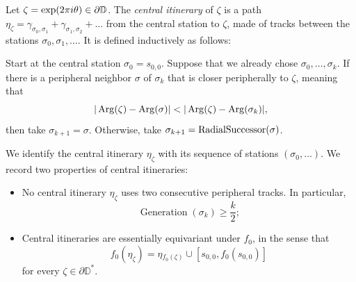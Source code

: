 \begin{definition}
Let $\zeta=\exp(2\pi i\theta)\in\partial\mathbb{D}$. 
The \emph{central itinerary} of $\zeta$ is a path 
$\eta_\zeta = \gamma _{\sigma_0,\sigma_1} + \gamma_{\sigma_1,\sigma_2}+\ldots$ 
from the central station to $\zeta$, made of tracks between the stations 
$\sigma_0,\sigma_1,\dots$. It is defined inductively as follows:

Start at the central station $\sigma_0=s_{0,0}$. Suppose that we already chose $\sigma_0,\ldots,\sigma_k$. If there is a peripheral neighbor $\sigma$ of $\sigma_k$ that is closer peripherally to $\zeta$, meaning that
$$
|\operatorname{Arg}(\zeta)-\operatorname{Arg}(\sigma)|
< |\operatorname{Arg}(\zeta)-\operatorname{Arg}(\sigma_{k})|,
$$
then take $\sigma_{k+1}=\sigma$. Otherwise, take $\sigma_{k+1}=\operatorname{RadialSuccessor}(\sigma)$.
\end{definition}



We identify the central itinerary $\eta_{\zeta}$ with its sequence of stations $(\sigma_0,\ldots)$. We record two properties of central itineraries:

\begin{itemize}
	\item No central itinerary $\eta_{\zeta}$ uses two consecutive peripheral tracks. In particular,
	\begin{equation}
	\label{generation-lower-bound}
		\operatorname{Generation}(\sigma_k)\geq \frac k2;
	\end{equation}
	
	\item Central itineraries are essentially equivariant under $f_{0}$, in the sense that
	\begin{equation*}
		f_{0}(\eta_{\zeta})=\eta{}_{f_{0}(\zeta)}\cup[s_{0,0},f_0(s_{0,0})]
	\end{equation*}
	for every $\zeta\in \partial \mathbb D^*$.
\end{itemize}

